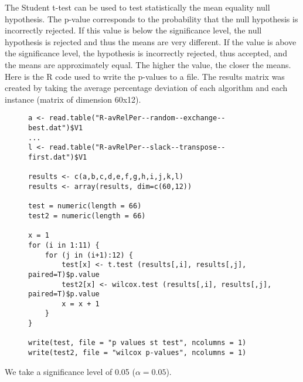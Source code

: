 The Student t-test can be used to test statistically the mean equality null hypothesis. The p-value corresponds to the probability that the null hypothesis is incorrectly rejected. If this value is below the significance level, the null hypothesis is rejected and thus the means are very different. If the value is above the significance level, the hypothesis is incorrectly rejected, thus accepted, and the means are approximately equal. The higher the value, the closer the means.\\

Here is the R code used to write the p-values to a file. The results matrix was created by taking the average percentage deviation of each algorithm and each instance (matrix of dimension 60x12).

\begin{figure}[H]
\begin{lstlisting}
a <- read.table("R-avRelPer--random--exchange--best.dat")$V1
...
l <- read.table("R-avRelPer--slack--transpose--first.dat")$V1

results <- c(a,b,c,d,e,f,g,h,i,j,k,l)
results <- array(results, dim=c(60,12))

test = numeric(length = 66)
test2 = numeric(length = 66)

x = 1
for (i in 1:11) {
	for (j in (i+1):12) {
		test[x] <- t.test (results[,i], results[,j], paired=T)$p.value
		test2[x] <- wilcox.test (results[,i], results[,j], paired=T)$p.value
		x = x + 1
	}
}

write(test, file = "p values st test", ncolumns = 1)
write(test2, file = "wilcox p-values", ncolumns = 1)
\end{lstlisting}
\end{figure}

We take a significance level of 0.05 ($\alpha = 0.05$).


